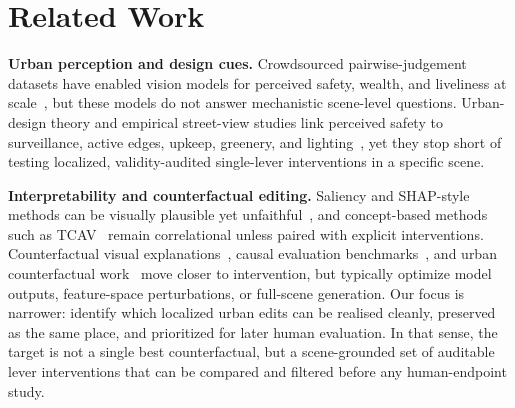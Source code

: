 \section{Related Work}

\noindent\textbf{Urban perception and design cues.}
Crowdsourced pairwise-judgement datasets have enabled vision models for
perceived safety, wealth, and liveliness at
scale~\cite{salesses2013,naik2014,dubey2016,quintana2025}, but these
models do not answer mechanistic scene-level questions. Urban-design
theory and empirical street-view studies link perceived safety to
surveillance, active edges, upkeep, greenery, and
lighting~\cite{jacobs1961,newman1972,loewen1993,li2015greenery,denadai2016lively,jiang2018brokenwindows,portnov2020lighting},
yet they stop short of testing localized, validity-audited
single-lever interventions in a specific scene.

\noindent\textbf{Interpretability and counterfactual editing.}
Saliency and SHAP-style methods can be visually plausible yet
unfaithful~\cite{adebayo2018}, and concept-based methods such as
TCAV~\cite{kim2018} remain correlational unless paired with explicit
interventions. Counterfactual visual explanations~\cite{goyal2019},
causal evaluation benchmarks~\cite{melistas2024}, and urban
counterfactual work~\cite{law2023,vera2025,zhao2026} move closer to
intervention, but typically optimize model outputs, feature-space
perturbations, or full-scene generation. Our focus is narrower:
identify which localized urban edits can be realised cleanly, preserved
as the same place, and prioritized for later human evaluation. In that
sense, the target is not a single best counterfactual, but a
scene-grounded set of auditable lever interventions that can be compared
and filtered before any human-endpoint study.
